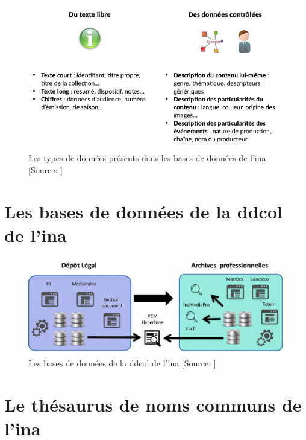 \begin{figure}[!h]
	\centering
	\includegraphics[width=15cm]{images/type_donnees_axel.png}
	\medskip
	\caption[Les types de données présents dans les bases de données de l'\ac{ina}]{Les types de données présents dans les bases de données de l'\ac{ina} [Source: \cite[p.6]{roche-diore_atelier_2020}]}
	\label{type_donnees_axel}
\end{figure}

\chapter{\label{annexe_bdd_ina}Les bases de données de la \ac{ddcol} de l'\ac{ina}}

\begin{figure}[!h]
	\centering
	\includegraphics[width=15cm]{images/bases_ddcol.png}
	\medskip
	\caption[Les bases de données de la \ac{ddcol} de l'\ac{ina}]{Les bases de données de la \ac{ddcol} de l'\ac{ina} [Source: \cite{poupeau_rassembler_2019}]}
	\label{bdd_ddcol_ina}
\end{figure}


\chapter{\label{annexe_thesaurus}Le thésaurus de noms communs de l'\ac{ina}}

